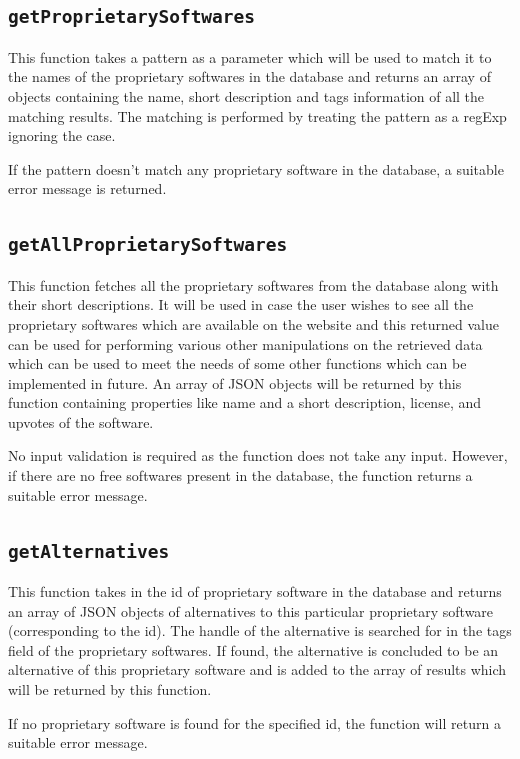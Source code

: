 \subsection{\texttt{getProprietarySoftwares}}
This function takes a pattern as a parameter which will be used to match it to the names of the proprietary softwares in the database and returns an array of objects containing the name, short description and tags information of all the matching results. The matching is performed by treating the pattern as a regExp ignoring the case.

If the pattern doesn’t match any proprietary software in the database, a suitable error message is returned.


\subsection{\texttt{getAllProprietarySoftwares}}
This function fetches all the proprietary softwares from the database along with their short descriptions. It will be used in case the user wishes to see all the proprietary softwares which are available on the website and this returned value can be used for performing various other manipulations on the retrieved data which can be used to meet the needs of some other functions which can be implemented in future.
An array of JSON objects will be returned by this function containing properties like name and a short description, license, and upvotes of the software.

No input validation is required as the function does not take any input. However, if there are no free softwares present in the database, the function returns a suitable error message.


\subsection{\texttt{getAlternatives}}
This function takes in the id of proprietary software in the database and returns an array of JSON objects of alternatives to this particular proprietary software (corresponding to the id). The handle of the alternative is searched for in the tags field of the proprietary softwares. If found, the alternative is concluded to be an alternative of this proprietary software and is added to the array of results which will be returned by this function.

If no proprietary software is found for the specified id, the function will return a suitable error message.


